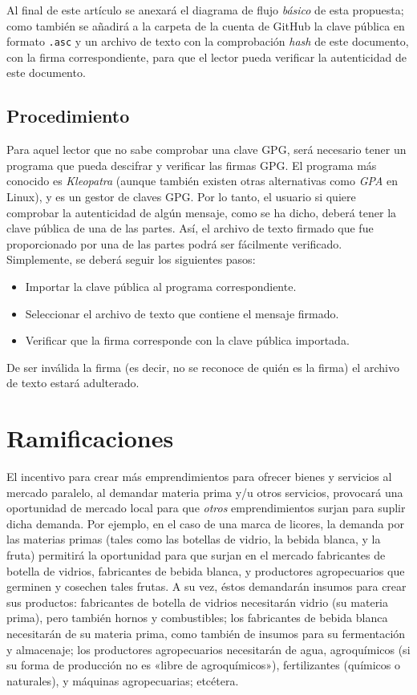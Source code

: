 \documentclass[12pt,a4paper]{article}
\begin{document}
Al final de este artículo se anexará el diagrama de flujo \textit{básico} de esta propuesta; como también se añadirá a la carpeta de la cuenta de GitHub la clave pública en formato \texttt{.asc} y un archivo de texto con la comprobación \textit{hash} de este documento, con la firma correspondiente, para que el lector pueda verificar la autenticidad de este documento.

\subsection{Procedimiento}
Para aquel lector que no sabe comprobar una clave GPG, será necesario tener un programa que pueda descifrar y verificar las firmas GPG. El programa más conocido es \textit{Kleopatra} (aunque también existen otras alternativas como \textit{GPA} en Linux), y es un gestor de claves GPG. Por lo tanto, el usuario si quiere comprobar la autenticidad de algún mensaje, como se ha dicho, deberá tener la clave pública de una de las partes. Así, el archivo de texto firmado que fue proporcionado por una de las partes podrá ser fácilmente verificado. Simplemente, se deberá seguir los siguientes pasos:

\begin{itemize}
\item Importar la clave pública al programa correspondiente.
\item Seleccionar el archivo de texto que contiene el mensaje firmado.
\item Verificar que la firma corresponde con la clave pública importada.
\end{itemize}

De ser inválida la firma (es decir, no se reconoce de quién es la firma) el archivo de texto estará adulterado.

\section{Ramificaciones}
El incentivo para crear más emprendimientos para ofrecer bienes y servicios al mercado paralelo, al demandar materia prima y/u otros servicios, provocará una oportunidad de mercado local para que \textit{otros} emprendimientos surjan para suplir dicha demanda. Por ejemplo, en el caso de una marca de licores, la demanda por las materias primas (tales como las botellas de vidrio, la bebida blanca, y la fruta) permitirá la oportunidad para que surjan en el mercado fabricantes de botella de vidrios, fabricantes de bebida blanca, y productores agropecuarios que germinen y cosechen tales frutas. A su vez, éstos demandarán insumos para crear sus productos: fabricantes de botella de vidrios necesitarán vidrio (su materia prima), pero también hornos y combustibles; los fabricantes de bebida blanca necesitarán de su materia prima, como también de insumos para su fermentación y almacenaje; los productores agropecuarios necesitarán de agua, agroquímicos (si su forma de producción no es «libre de agroquímicos»), fertilizantes (químicos o naturales), y máquinas agropecuarias; etcétera.
\end{document}
